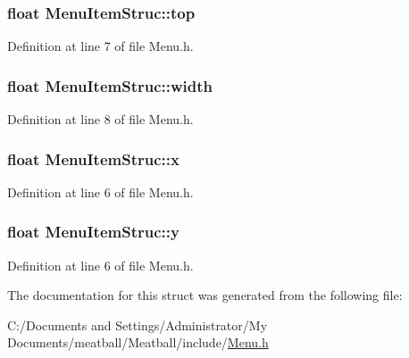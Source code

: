 \hypertarget{struct_menu_item_struc_a4b9b11a43fdec82463e1f4eee9eb5a20}{
\subsubsection[{top}]{\setlength{\rightskip}{0pt plus 5cm}float Menu\-Item\-Struc\-::top}}\label{struct_menu_item_struc_a4b9b11a43fdec82463e1f4eee9eb5a20}


Definition at line 7 of file Menu.\-h.

\hypertarget{struct_menu_item_struc_a22efb659c4cc71c564e26858e3c9a4c6}{
\subsubsection[{width}]{\setlength{\rightskip}{0pt plus 5cm}float Menu\-Item\-Struc\-::width}}\label{struct_menu_item_struc_a22efb659c4cc71c564e26858e3c9a4c6}


Definition at line 8 of file Menu.\-h.

\hypertarget{struct_menu_item_struc_a1835197fea1ec66488b3df6ec9c398da}{
\subsubsection[{x}]{\setlength{\rightskip}{0pt plus 5cm}float Menu\-Item\-Struc\-::x}}\label{struct_menu_item_struc_a1835197fea1ec66488b3df6ec9c398da}


Definition at line 6 of file Menu.\-h.

\hypertarget{struct_menu_item_struc_abb8b4c3d8474a2938defd2cdbea74fa2}{
\subsubsection[{y}]{\setlength{\rightskip}{0pt plus 5cm}float Menu\-Item\-Struc\-::y}}\label{struct_menu_item_struc_abb8b4c3d8474a2938defd2cdbea74fa2}


Definition at line 6 of file Menu.\-h.



The documentation for this struct was generated from the following file\-:\begin{DoxyCompactItemize}
\item 
C\-:/\-Documents and Settings/\-Administrator/\-My Documents/meatball/\-Meatball/include/\hyperlink{_menu_8h}{Menu.\-h}\end{DoxyCompactItemize}
